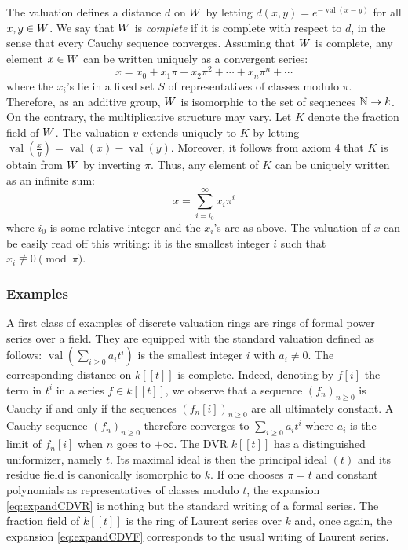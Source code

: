 \documentclass{article}
\DeclareMathOperator{\val}{val}
\begin{document}
The valuation defines a distance $d$ on $W$ by letting $d(x,y) = 
e^{-\val(x-y)}$ for all $x, y \in W$. We say that $W$ is 
\emph{complete} if it is complete with respect to $d$, in the sense that 
every Cauchy sequence converges. Assuming that $W$ is complete, any 
element $x \in W$ can be written uniquely as a convergent series:
\begin{equation}
\label{eq:expandCDVR}
x = x_0 + x_1 \pi + x_2 \pi^2 + \cdots + x_n \pi^n + \cdots
\end{equation}
where the $x_i$'s lie in a fixed set $S$ of representatives of classes
modulo $\pi$. Therefore, as an additive group, $W$ is isomorphic to 
the set of sequences $\mathbb N \to k$. On the contrary, the multiplicative
structure may vary.
Let $K$ denote the fraction field of $W$. The valuation $v$ extends 
uniquely to $K$ by letting $\val(\frac x y) = \val(x) - \val(y)$. 
Moreover, it follows from axiom 4 that $K$ is obtain from $W$ by 
inverting $\pi$. Thus, any element of $K$ can be uniquely written as an 
infinite sum:
\begin{equation}
\label{eq:expandCDVF}
x = \sum_{i=i_0}^\infty x_i \pi^i
\end{equation}
where $i_0$ is some relative integer and the $x_i$'s are as above. The 
valuation of $x$ can be easily read off this writing: it is the smallest 
integer $i$ such that $x_i \not\equiv 0 \pmod \pi$.

\subsubsection{Examples}

A first class of examples of discrete valuation rings 
are rings of formal power series over a field. They are equipped with 
the standard valuation defined as follows: $\val(\sum_{i \geq 0} a_i 
t^i)$ is the smallest integer $i$ with $a_i \neq 0$. The corresponding 
distance on $k[[t]]$ is complete. Indeed, denoting by $f[i]$ the term in 
$t^i$ in a series $f \in k[[t]]$, we observe that a sequence $(f_n)_{n 
\geq 0}$ is Cauchy if and only if the sequences $(f_n[i])_{n \geq 0}$ 
are all ultimately constant. A Cauchy sequence $(f_n)_{n \geq 0}$ 
therefore converges to $\sum_{i \geq 0} a_i t^i$ where $a_i$ is the 
limit of $f_n[i]$ when $n$ goes to $+\infty$.
The DVR $k[[t]]$ has a distinguished uniformizer, namely $t$. Its 
maximal ideal is then the principal ideal $(t)$ and its residue field
is canonically isomorphic to $k$. 
If one chooses $\pi = t$ and constant polynomials as representatives of 
classes modulo $t$, the expansion \eqref{eq:expandCDVR} is nothing but 
the standard writing of a formal series.
The fraction field of $k[[t]]$ is the ring of Laurent series over $k$
and, once again, the expansion \eqref{eq:expandCDVF} corresponds to the
usual writing of Laurent series.
\end{document}
